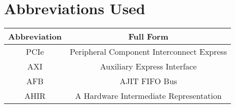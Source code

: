 \chapter{Abbreviations Used}

\begin{center}
\begin{tabular}{c | c}
Abbreviation & Full Form \\
\hline
PCIe & Peripheral Component Interconnect Express \\
AXI & Auxiliary Express Interface\\
AFB & AJIT FIFO Bus \\
AHIR & A Hardware Intermediate Representation
\end{tabular}
\end{center}
